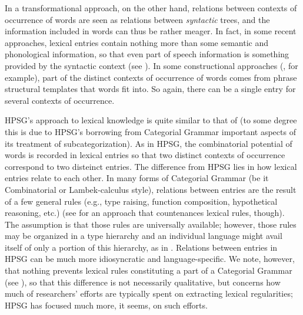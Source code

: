 \documentclass[output=paper]{langsci/langscibook}
\begin{document}
In a transformational approach, on the other hand, relations between contexts of occurrence of words are seen as relations between \emph{syntactic} trees, and the information included in words can thus be rather meager. In fact, in some recent approaches, lexical entries contain nothing more than some semantic and phonological information, so that even part of speech information is something provided by the syntactic context (see \citealt{Borer2003,Marantz1997}). In some constructional approaches  (\citet{Goldberg95a}, for example), part of the distinct contexts of occurrence of words comes from phrase structural templates that words fit into. So again, there can be a single entry for several contexts of occurrence.

HPSG's approach to lexical knowledge is quite similar to that of  (to some degree this is due to HPSG's borrowing from Categorial Grammar important aspects of its treatment of subcategorization). As in HPSG, the combinatorial potential of words is recorded in lexical entries so that two distinct contexts of occurrence correspond to two disteinct entries. The difference from HPSG lies in how lexical entries relate to each other. In many forms of Categorial Grammar (be it Combinatorial or Lambek-calculus style), relations between entries are the result of a few general rules (e.g., type raising, function composition, hypothetical reasoning, etc.) (see \citet{Dowty1978} for an approach that countenances lexical rules, though).
The assumption is that those rules are universally available; however, those rules may be organized in a type hierarchy and an individual language might avail itself of only a portion of this hierarchy, as in \citep{Baldridge2002}. Relations between entries in HPSG can be much more idiosyncratic and language-specific. We note, however, that nothing prevents lexical rules constituting a part of a Categorial Grammar (see \citealt{Carpenter1992b}), so that this difference is not necessarily qualitative, but concerns how much of researchers' efforts are typically spent on extracting lexical regularities; HPSG has focused much more, it seems, on such efforts.
\end{document}
